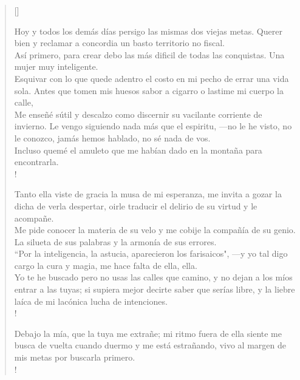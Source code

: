 \documentclass[11pt, a4paper]{article} %
\begin{document}

\settowidth{\versewidth}{Quiere mi tiempo libre la sutil, flexible dicha de buscarla, ------------------------------------------------------------------} %

\begin{verse}[\versewidth]
{\large

Hoy y todos los demás días persigo las mismas dos viejas metas. Querer bien y reclamar 
a concordia un basto territorio no fiscal. \\

Así primero, para crear debo las más dificil de todas las conquistas. 
Una mujer muy inteligente. \\

Esquivar con lo que quede adentro el costo en mi pecho de errar una vida sola. 
Antes que tomen mis huesos sabor a cigarro o lastime mi cuerpo la calle, \\

Me enseñé sútil y descalzo como discernir su vacilante corriente de invierno. 
Le vengo siguiendo nada más que el espiritu, ---no le he visto, 
no le conozco, jamás hemos hablado, no sé nada de vos. \\

Incluso quemé el amuleto que me habían dado en la montaña para encontrarla. \\!

Tanto ella viste de gracia la musa de mi esperanza, me invita a gozar 
la dicha de verla despertar, oirle traducir el delirio de su virtud y le acompañe.\\

Me pide conocer la materia de su velo y me cobije la compañía de su genio. 
La silueta de sus palabras y la armonía de sus errores. \\

``Por la inteligencia, la astucia, aparecieron 
los farisaicos", ---y yo tal digo cargo la cura y magia, 
me hace falta de ella, ella.\\

Yo te he buscado pero no usas las calles que camino, 
y no dejan a los míos entrar a las tuyas; si supiera mejor decirte saber que serías libre, 
y la liebre laíca de mi lacónica lucha de intenciones.\\!

Debajo la mía, que la tuya me extrañe; mi ritmo fuera de ella siente me busca 
de vuelta cuando duermo y me está estrañando, 
vivo al margen de mis metas por buscarla primero. \\!

}
\end{verse}
\end{document}
